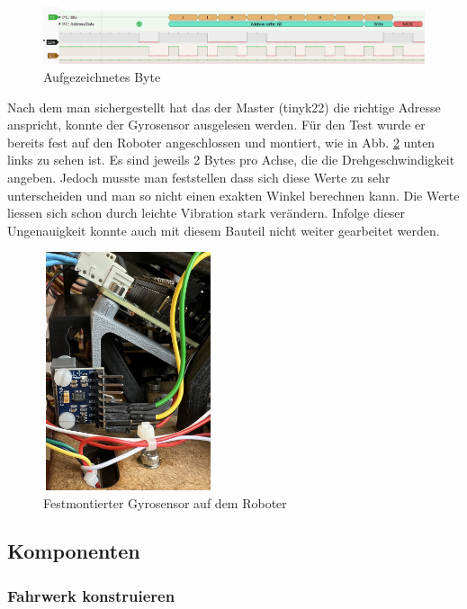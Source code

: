 \begin{figure}[h]
\centering
\includegraphics[width=\textwidth]{assets/ET/Gyroskop/Gyroskop.png}
\caption{Aufgezeichnetes Byte}
\label{fig:Gyroskop}
\end{figure}


Nach dem man sichergestellt hat das der Master (\acrshort{tinyk22}) die richtige Adresse anspricht, konnte der Gyrosensor ausgelesen werden. Für den Test wurde er bereits fest auf den Roboter angeschlossen und montiert, wie in Abb. \ref{fig:Gyroskop auf dem Roboter} unten links zu sehen ist. Es sind jeweils 2 Bytes pro Achse, die die Drehgeschwindigkeit angeben. Jedoch musste man feststellen dass sich diese Werte zu sehr unterscheiden und man so nicht einen exakten Winkel berechnen kann. Die Werte liessen sich schon durch leichte Vibration stark verändern.  Infolge dieser Ungenauigkeit konnte auch mit diesem Bauteil nicht weiter gearbeitet werden.


\begin{figure}[h]
\centering
\includegraphics[width=5cm, height=7cm]{assets/ET/Gyroskop/Gyro_Montiert.jpeg}
\caption{Festmontierter Gyrosensor auf dem Roboter}
\label{fig:Gyroskop auf dem Roboter}
\end{figure}


\subsection{Komponenten}
\label{Komponenten}

\subsubsection{Fahrwerk konstruieren}
\label{Fahrwerk konstruieren}

